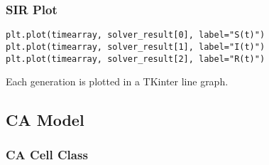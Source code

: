 \documentclass[11pt, a4paper]{article}
\begin{document}
\subsubsection{SIR Plot}
\begin{lstlisting}
plt.plot(timearray, solver_result[0], label="S(t)")
plt.plot(timearray, solver_result[1], label="I(t)")
plt.plot(timearray, solver_result[2], label="R(t)")
\end{lstlisting}
Each generation is plotted in a TKinter line graph.
\subsection{CA Model}
\subsubsection{CA Cell Class}
\end{document}
